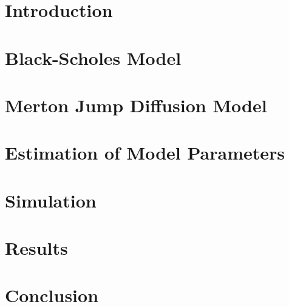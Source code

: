 \documentclass[11pt]{article}
\begin{document}
	
	
	\label{sec:Abstract}
	
	\newpage

	\tableofcontents
	\setcounter{page}{1}
	\newpage

	\section{Introduction}
	\label{sec:Introduction}
	

	\section{Black-Scholes Model}
	\label{sec:Black-Scholes Model}
	

	\section{Merton Jump Diffusion Model}
	\label{sec:Merton Jump Diffusion Model}
	

	\section{Estimation of Model Parameters}
	\label{sec:Estimation of Model Parameters}
	

	\section{Simulation}
	\label{sec:Simulation}
	
	
	\section{Results}
	\label{sec:Results}
	

	\section{Conclusion}
	\label{sec:Conclusion}
	
	
	\newpage
	\appendix
	\appendixname
	
\end{document}
